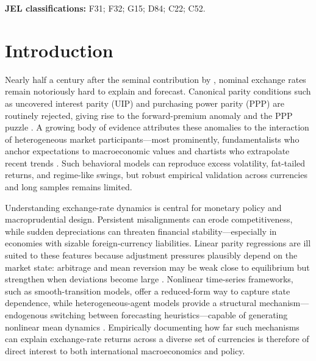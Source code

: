 \documentclass[a4paper,10pt,final]{article}    %
\begin{document}
\noindent \textbf{JEL classifications:} F31; F32; G15; D84; C22; C52.


\thispagestyle{empty}
\clearpage

\tableofcontents

\thispagestyle{empty}
\clearpage



\section{Introduction}
\label{chap:introduction}

Nearly half a century after the seminal contribution by \citet{MeeseRogoff1983}, nominal exchange rates remain notoriously hard to explain and forecast. Canonical parity conditions such as uncovered interest parity (UIP) and purchasing power parity (PPP) are routinely rejected, giving rise to the forward-premium anomaly and the PPP puzzle \citep{Rogoff1996,Engel2014}. A growing body of evidence attributes these anomalies to the interaction of heterogeneous market participants—most prominently, fundamentalists who anchor expectations to macroeconomic values and chartists who extrapolate recent trends \citep{FrankelFroot1987,BrockHommes1997,DeGrauwe2006}. Such behavioral models can reproduce excess volatility, fat-tailed returns, and regime-like swings, but robust empirical validation across currencies and long samples remains limited.

Understanding exchange-rate dynamics is central for monetary policy and macroprudential design. Persistent misalignments can erode competitiveness, while sudden depreciations can threaten financial stability—especially in economies with sizable foreign-currency liabilities. Linear parity regressions are ill suited to these features because adjustment pressures plausibly depend on the market state: arbitrage and mean reversion may be weak close to equilibrium but strengthen when deviations become large \citep{Sarno2006}. Nonlinear time-series frameworks, such as smooth-transition models, offer a reduced-form way to capture state dependence, while heterogeneous-agent models provide a structural mechanism—endogenous switching between forecasting heuristics—capable of generating nonlinear mean dynamics \citep{TaylorPeelSarno2001,DeGrauwe2006}. Empirically documenting how far such mechanisms can explain exchange-rate returns across a diverse set of currencies is therefore of direct interest to both international macroeconomics and policy.
\end{document}
